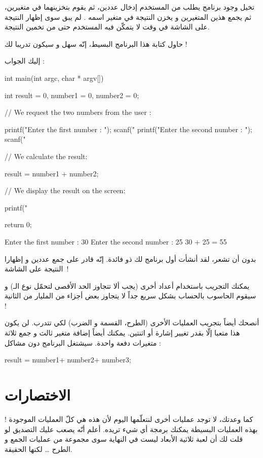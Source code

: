 تخيل وجود برنامج يطلب من المستخدم إدخال عددين، ثم يقوم بتخزينهما في متغيرين، ثم يجمع هذين المتغيرين و يخزن النتيجة في متغير اسمه
.
لم يبق سوى إظهار النتيجة على الشاشة في وقت لا يتمكّن فيه المستخدم حتى من تخمين النتيجة.

حاول كتابة هذا البرنامج البسيط، إنّه سهل و سيكون تدريبا لك !

إليك الجواب :

\begin{Csource}
int main(int argc, char * argv[])
{
  int result = 0, number1 = 0, number2 = 0;

  // We request the two numbers from the user :

  printf("Enter the first number : ");
  scanf("%
  printf("Enter the second number : ");
  scanf("%

  // We calculate the result:

  result = number1 + number2;

  // We display the result on the screen:

  printf("%

  return 0;
}
\end{Csource}

\begin{Console}
  Enter the first number : 30
  Enter the second number : 25
  30 + 25 = 55
\end{Console}

بدون أن تشعر، لقد أنشأت أول برنامج لك ذو فائدة. إنّه قادر على جمع عددين و إظهارا النتيجة على الشاشة~!

يمكنك التجريب باستخدام أعداد أخرى (يجب ألا تتجاوز الحد الأقصى لتحمّل نوع الـ)
و سيقوم الحاسوب بالحساب بشكل سريع جداً لا يتجاوز بعض أجزاء من المليار من الثانية !

أنصحك أيضاً بتجريب العمليات الأخرى (الطرح، القسمة و الضرب) لكي تتدرب. لن يكون هذا متعبا إلّا بقدر تغيير إشارة أو اثنتين. يمكنك أيضاً إضافة متغير ثالث و جمع ثلاثة متغيرات دفعة واحدة. سيشتغل البرنامج دون مشاكل :

\begin{Csource}
result = number1+ number2+ number3;
\end{Csource}

\section{الاختصارات}

كما وعدتك، لا توجد عمليات أخرى لنتعلّمها اليوم لأن هذه هي كلّ العمليات الموجودة ! بهذه العمليات البسيطة يمكنك برمجة أي شيء تريده. أعلم أنّه يصعب عليك التصديق لو قلت لك أن لعبة ثلاثية الأبعاد ليست في النهاية سوى مجموعة من عمليات الجمع و الطرح
\dots
لكنها الحقيقة.

